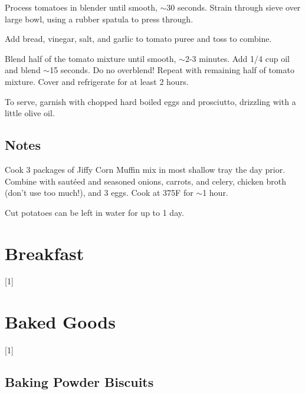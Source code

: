 \documentclass[oneside]{book}  %
\def\thisrecipe{}  %
\newcommand{\chapterrec}[1]{  %
  \newpage \def\thisrecipe{} \chapter{#1} \vspace{1.1em}
}
\newcommand{\chaptertoc}[1]{  %
  \chapterrec{#1} \vspace{-1.1em}  %
  \startcontents[chapters] \printcontents[chapters]{chapter_toc_}{1}[1]{}
}
\newcommand{\recipe}[1]{\section{#1}\def\thisrecipe{: #1}} %
\newcommand{\degF}{\textdegree F\xspace}
\newcommand{\about}{$\sim$}
\begin{document}
\begin{directions}
  \item Process tomatoes in blender until smooth, \about 30 seconds. Strain
  through sieve over large bowl, using a rubber spatula to press through.

  \item Add bread, vinegar, salt, and garlic to tomato puree and toss to
  combine.

  \item Blend half of the tomato mixture until smooth, \about 2-3 minutes. Add
  1/4 cup oil and blend \about 15 seconds. Do no overblend! Repeat with
  remaining half of tomato mixture. Cover and refrigerate for at least 2 hours.

  \item To serve, garnish with chopped hard boiled eggs and prosciutto,
  drizzling with a little olive oil.
\end{directions}
\recipe{Notes} \label{notes:sides} %
\begin{kitchennotes}
  \item[Cornbread Dressing] \label{recipe:cornbread_dressing}
    Cook 3 packages of Jiffy Corn Muffin mix in most shallow tray the day prior.
    Combine with saut\'eed and seasoned onions, carrots, and celery, chicken
    broth (don't use too much!), and 3 eggs. Cook at 375\degF for \about 1 hour.
  \item[Mashed Potatoes] \label{recipe:mashed_potatoes}
     
    Cut potatoes can be left in water for up to 1 day.
    \todo
\end{kitchennotes}

\chaptertoc{Breakfast} \label{chap:breakfast}

\chaptertoc{Baked Goods} \label{chap:baked_goods}
\recipe{Baking Powder Biscuits} \label{recipe:baking_powder_biscuits} %
\end{document}
